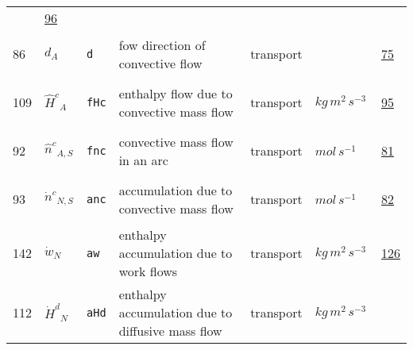 \begin{longtable}{|p{1cm}|p{2.5cm}|p{4.5cm}|p{8cm}|p{3.0cm}|p{3cm}|p{1cm}|}
             &                 \hyperlink{"e:96"}{ 96 }
                 \\
            86
             & \hypertarget{"v:86"}{ $ {d}{_{A}} $}
             & \verb|d|
             & fow direction of convective flow
             & \begin{lay}transport \end{lay}
             & $  $
             &                 \hyperlink{"e:75"}{ 75 }
                 \\
            109
             & \hypertarget{"v:109"}{ $ {{\hat{H}^c}}{_{A}} $}
             & \verb|fHc|
             & enthalpy flow due to convective mass flow
             & \begin{lay}transport \end{lay}
             & $ kg \,m^{2} \,s^{-3} \, $
             &                 \hyperlink{"e:95"}{ 95 }
                 \\
            92
             & \hypertarget{"v:92"}{ $ {{\hat{n}^c}}{_{A, S}} $}
             & \verb|fnc|
             & convective mass flow in an arc
             & \begin{lay}transport \end{lay}
             & $ mol \,s^{-1} \, $
             &                 \hyperlink{"e:81"}{ 81 }
                 \\
            93
             & \hypertarget{"v:93"}{ $ {{\dot{n}^c}}{_{N, S}} $}
             & \verb|anc|
             & accumulation due to convective mass flow
             & \begin{lay}transport \end{lay}
             & $ mol \,s^{-1} \, $
             &                 \hyperlink{"e:82"}{ 82 }
                 \\
            142
             & \hypertarget{"v:142"}{ $ {{\dot{w}}}{_{N}} $}
             & \verb|aw|
             & enthalpy accumulation due to work flows
             & \begin{lay}transport \end{lay}
             & $ kg \,m^{2} \,s^{-3} \, $
             &                 \hyperlink{"e:126"}{ 126 }
                 \\
            112
             & \hypertarget{"v:112"}{ $ {{\dot{H}^d}}{_{N}} $}
             & \verb|aHd|
             & enthalpy accumulation due to diffusive mass flow
             & \begin{lay}transport \end{lay}
             & $ kg \,m^{2} \,s^{-3} \, $

\end{longtable}

